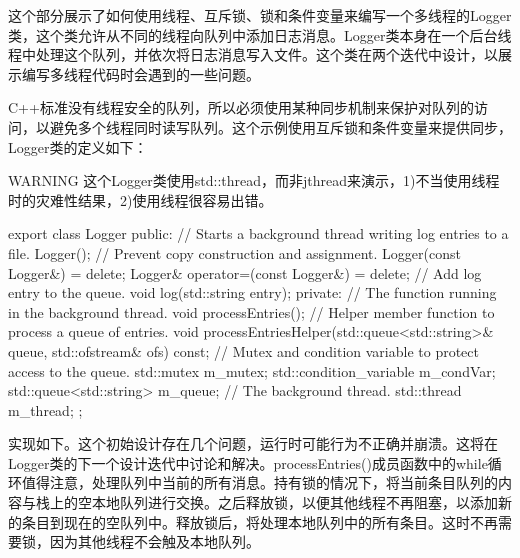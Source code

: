 这个部分展示了如何使用线程、互斥锁、锁和条件变量来编写一个多线程的Logger类，这个类允许从不同的线程向队列中添加日志消息。Logger类本身在一个后台线程中处理这个队列，并依次将日志消息写入文件。这个类在两个迭代中设计，以展示编写多线程代码时会遇到的一些问题。

C++标准没有线程安全的队列，所以必须使用某种同步机制来保护对队列的访问，以避免多个线程同时读写队列。这个示例使用互斥锁和条件变量来提供同步，Logger类的定义如下：

\begin{myWarning}{WARNING}
这个Logger类使用std::thread，而非jthread来演示，1)不当使用线程时的灾难性结果，2)使用线程很容易出错。
\end{myWarning}

\begin{cpp}
export class Logger
{
    public:
        // Starts a background thread writing log entries to a file.
        Logger();
        // Prevent copy construction and assignment.
        Logger(const Logger&) = delete;
        Logger& operator=(const Logger&) = delete;
        // Add log entry to the queue.
        void log(std::string entry);
    private:
        // The function running in the background thread.
        void processEntries();
        // Helper member function to process a queue of entries.
        void processEntriesHelper(std::queue<std::string>& queue,
            std::ofstream& ofs) const;
        // Mutex and condition variable to protect access to the queue.
        std::mutex m_mutex;
        std::condition_variable m_condVar;
        std::queue<std::string> m_queue;
        // The background thread.
        std::thread m_thread;
};
\end{cpp}

实现如下。这个初始设计存在几个问题，运行时可能行为不正确并崩溃。这将在Logger类的下一个设计迭代中讨论和解决。processEntries()成员函数中的while循环值得注意，处理队列中当前的所有消息。持有锁的情况下，将当前条目队列的内容与栈上的空本地队列进行交换。之后释放锁，以便其他线程不再阻塞，以添加新的条目到现在的空队列中。释放锁后，将处理本地队列中的所有条目。这时不再需要锁，因为其他线程不会触及本地队列。

